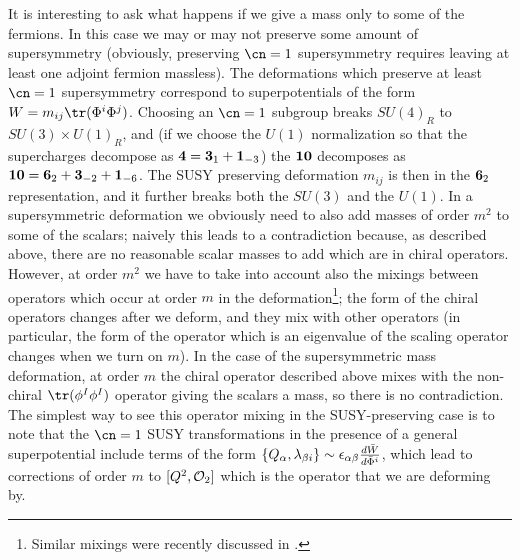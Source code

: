  It is interesting to ask what happens if we give a mass only to some
 of the fermions. In this case we may or may not preserve some amount
 of supersymmetry (obviously, preserving $\cn=1$ supersymmetry
 requires leaving at least one adjoint fermion massless). The
 deformations which preserve at least $\cn=1$ supersymmetry correspond
 to superpotentials of the form $W = m_{ij} \tr(\Phi^i
 \Phi^j)$. Choosing an $\cn=1$ subgroup breaks $SU(4)_R$ to
 $SU(3)\times U(1)_R$, and (if we choose the $U(1)$ normalization so
 that the supercharges decompose as ${\bf 4} = {\bf 3}_1 + {\bf
 1}_{-3}$) the ${\bf 10}$ decomposes as ${\bf 10} = {\bf 6}_2 + {\bf
 3}_{-2} + {\bf 1}_{-6}$. The SUSY preserving deformation $m_{ij}$ is
 then in the ${\bf 6}_2$ representation, and it further breaks both
 the $SU(3)$ and the $U(1)$. In a supersymmetric deformation we
 obviously need to also add masses of order $m^2$ to some of the
 scalars; naively this leads to a contradiction because, as described
 above, there are no reasonable scalar masses to add which are in
 chiral operators. However, at order $m^2$ we have to take into
 account also the mixings between operators which occur at order $m$
 in the deformation\footnote{Similar mixings were recently discussed in
 \cite{Intriligator:1999ff}.}; the form of the chiral operators changes after we
 deform, and they mix with other operators (in particular, the form of
 the operator which is an eigenvalue of the scaling operator changes
 when we turn on $m$). In the case of the supersymmetric mass
 deformation, at order $m$ the chiral operator 
 described above mixes with the non-chiral $\tr(\phi^I \phi^I)$
 operator giving the scalars a mass, so there is no contradiction. The
 simplest way to see this operator mixing in the SUSY-preserving case
 is to note that the $\cn=1$ SUSY transformations in the presence of a
 general superpotential include terms of the form $\{Q_{\alpha},
 \lambda_{\beta i}\} \sim \epsilon_{\alpha \beta} {d{\bar W}\over
 d{{\bar \Phi}^i}}$, which lead to corrections of order $m$ to $[Q^2,
 {\cal O}_2]$ which is the operator that we are deforming by.

